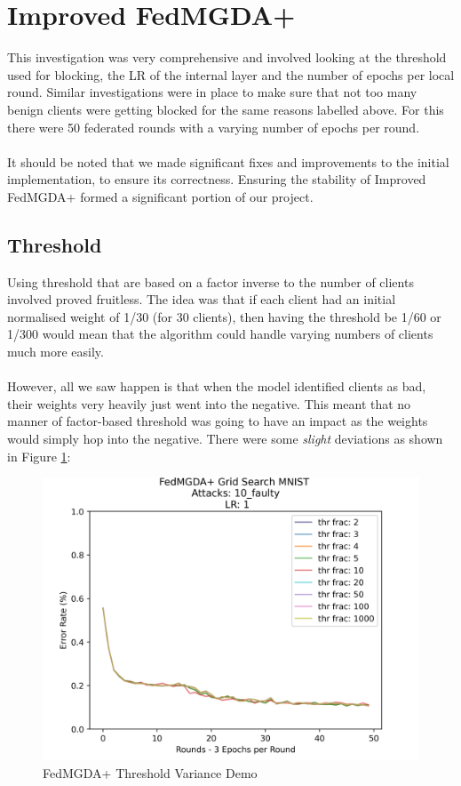 \section{Improved FedMGDA+}
This investigation was very comprehensive and involved looking at the threshold used for blocking, the LR of the internal layer and the number of epochs per local round. 
Similar investigations were in place to make sure that not too many benign clients were getting blocked for the same reasons labelled above.
For this there were 50 federated rounds with a varying number of epochs per round.
\\ \\
It should be noted that we made significant fixes and improvements to the initial implementation, to ensure its correctness. Ensuring the stability of Improved FedMGDA+ formed a significant portion of our project.

\subsection{Threshold}
Using threshold that are based on a factor inverse to the number of clients involved proved fruitless.
The idea was that if each client had an initial normalised weight of 1/30 (for 30 clients), then having the threshold be 1/60 or 1/300 would mean that the algorithm could handle varying numbers of clients much more easily.
\\ \\
However, all we saw happen is that when the model identified clients as bad, their weights very heavily just went into the negative.
This meant that no manner of factor-based threshold was going to have an impact as the weights would simply hop into the negative.
There were some \textit{slight} deviations as shown in Figure \ref{fig:mgda_var}:
\begin{figure}[htbp]
	\centering
    \includegraphics[scale=0.7]{initial/graphs/mgda_var.png}
	\caption{FedMGDA+ Threshold Variance Demo}
	\label{fig:mgda_var}
\end{figure}

